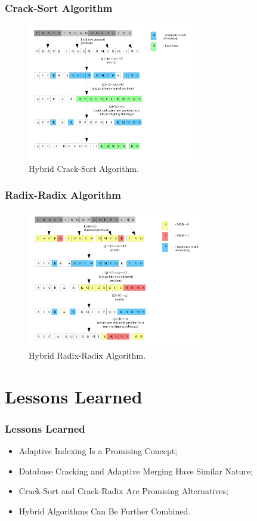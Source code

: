 \documentclass{beamer}
\begin{document}
\begin{frame}
\frametitle{Crack-Sort Algorithm}
\begin{figure}
\centering
\includegraphics[height=6cm , keepaspectratio]{graphics/hcs.png}
\caption{Hybrid Crack-Sort Algorithm.}
\end{figure}

\end{frame}

\begin{frame}
\frametitle{Radix-Radix Algorithm}
\begin{figure}
\centering
\includegraphics[height=6cm , keepaspectratio]{graphics/hrr.png}
\caption{Hybrid Radix-Radix Algorithm.}
\end{figure}
\end{frame}

\section{Lessons Learned}
\begin{frame}
\frametitle{Lessons Learned}
\begin{itemize}
\item{Adaptive Indexing Is a Promising Concept;}
\item{Database Cracking and Adaptive Merging Have Similar Nature;}\item{Crack-Sort and Crack-Radix Are Promising Alternatives;}
\item{Hybrid Algorithms Can Be Further Combined.}
\end{itemize}
\end{frame}
\end{document}
